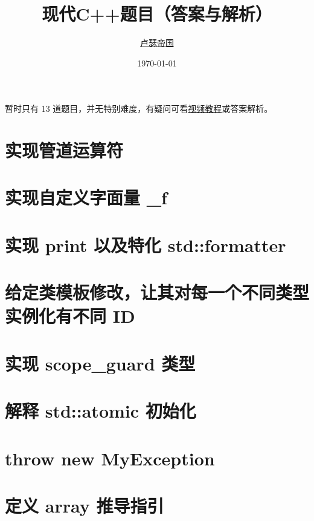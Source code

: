 \documentclass[11pt,fancyhdr]{ctexart}
\title{现代C++题目（答案与解析）}
\author{\href{https://github.com/Mq-b/Loser-HomeWork}{卢瑟帝国}\\}
\date{\today}
\begin{document}
\maketitle

\tableofcontents
\newpage

暂时只有 13 道题目，并无特别难度，有疑问可看\href{https://www.bilibili.com/video/BV1Zj411r7eP/}{视频教程}或答案解析。



\section{实现管道运算符}


\newpage

\section{实现自定义字面量 \_f}


\section{实现 print 以及特化 std::formatter}


\section{给定类模板修改，让其对每一个不同类型实例化有不同 ID}


\section{实现 scope\_guard 类型}

\section{解释 std::atomic 初始化}

\section{throw new MyException}

\section{定义 array 推导指引}
\end{document}
